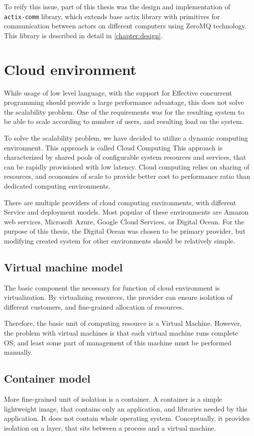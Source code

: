 To reify this issue, part of this thesis was the design and implementation of \verb|actix-comm| library, which extends
base actix library with primitives for communication between actors on different computers using ZeroMQ technology.
This library is described in detail in \autoref{chapter:design}.

\section{Cloud environment}
While usage of low level language, with the support for Effective concurrent programming should provide a large performance
advantage, this does not solve the scalability problem. One of the requirements was for the resulting system to
be able to scale according to number of users, and resulting load on the system.

To solve the scalability problem, we have decided to utilize a dynamic computing environment. This approach is called Cloud Computing\cite{wiki:cloud}
This approach is characterized by shared pools of configurable system resources and services, that can be rapidly provisioned
with low latency. Cloud computing relies on sharing of resources, and economies of scale to provide better
cost to performance ratio than dedicated computing environments.

There are multiple providers of cloud computing environments, with different Service and deployment models.
Most popular of these environments are Amazon web services, Microsoft Azure, Google Cloud Services, or Digital Ocean. For the purpose of
this thesis, the Digital Ocean was chosen to be primary provider, but modifying created system for other
environments should be relatively simple.

\subsection{Virtual machine model}
The basic component the necessary for function of cloud environment is virtualization. By virtualizing resources,
the provider can ensure isolation of different customers, and fine-grained allocation of resources.

Therefore, the basic unit of computing resource is a Virtual Machine. However, the problem with virtual machines
is that each virtual machine runs complete OS, and least some part of management of this machine
must be performed manually.

\subsection{Container model}
More fine-grained unit of isolation is a container. A container is a simple lightweight image, that contains
only an application, and libraries needed by this application. It does not contain whole operating system.
Conceptually, it provides isolation on a layer, that sits between a process and a virtual machine.


